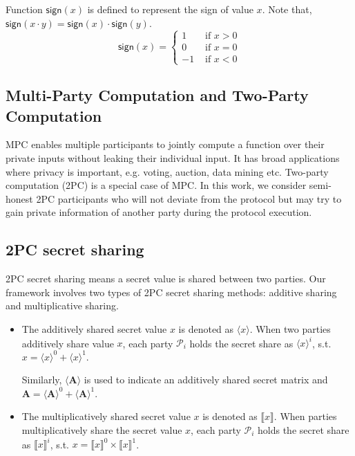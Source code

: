 \documentclass[letterpaper]{article} %
\begin{document}
    Function $\mathsf{sign}(x)$ is defined to represent the sign of value $x$.
    Note that, $\mathsf{sign}(x\cdot y)=\mathsf{sign}(x)\cdot \mathsf{sign}(y)$.
    $$\mathsf{sign}(x)=\begin{cases}
        1 & \text{ if } x>0 \\
        0 & \text{ if } x=0\\
        -1 & \text{ if } x<0
    \end{cases}$$

    \subsection{Multi-Party Computation and Two-Party Computation}
    MPC enables multiple participants to jointly compute a function over their private inputs without leaking
	their individual input. It has broad applications where privacy is important, e.g. voting, auction,
	data mining etc. Two-party computation (2PC) is a special case of MPC.
    In this work, we consider semi-honest 2PC participants
    who will not deviate from the protocol but may try to gain private information of another party
		during the protocol execution.

    \subsection{2PC secret sharing}
    2PC secret sharing means a secret value is shared between two parties.
    Our framework involves two types of 2PC secret sharing methods:
    additive sharing and multiplicative sharing.
    \begin{itemize}
        \item
        The additively shared secret value $x$ is denoted as $\langle x\rangle $.
        When two parties additively share value $x$,
        each party $\mathcal{P}_{i}$ holds the secret share as $\langle x\rangle ^{i}$, s.t.
        $x=\langle x\rangle ^{0}+\langle x\rangle ^{1}$.

        Similarly, $\langle \mathbf{A}\rangle $ is used to indicate an additively shared secret matrix
        and $\mathbf{A} =\langle \mathbf{A}\rangle ^{0}+\langle \mathbf{A}\rangle ^{1}$.

        \item The multiplicatively shared secret value $x$ is denoted as $\llbracket x \rrbracket$.
        When parties multiplicatively share the secret value $x$,
        each party $\mathcal{P}_{i}$ holds the secret share as $\llbracket x \rrbracket ^{i}$, s.t.
        $x=\llbracket x \rrbracket ^{0}\times \llbracket x \rrbracket ^{1}$.

    \end{itemize}
\end{document}
